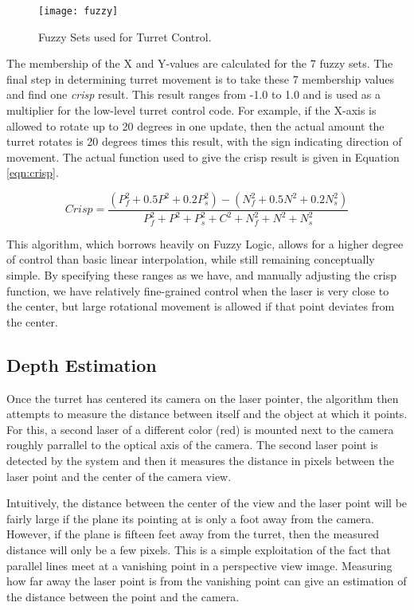 \documentclass[10pt,twocolumn,letterpaper]{article}
\begin{document}
\begin{figure}[t]
\begin{center}
  \texttt{[image: fuzzy]}
\end{center}
   \caption{Fuzzy Sets used for Turret Control.}
\label{fig:fuzzy}
\end{figure}

The membership of the X and Y-values are calculated for the 7 fuzzy sets. The final step in determining turret movement is to take these 7 membership values and find one \textit{crisp} result. This result ranges from -1.0 to 1.0 and is used as a multiplier for the low-level turret control code. For example, if the X-axis is allowed to rotate up to 20 degrees in one update, then the actual amount the turret rotates is 20 degrees times this result, with the sign indicating direction of movement. The actual function used to give the crisp result is given in Equation \ref{eqn:crisp}.

\begin{equation}
	\mathit{Crisp} = \frac{(P_f^2 + 0.5P^2 + 0.2P_s^2) - (N_f^2 + 0.5N^2 + 0.2N_s^2)}{P_f^2+P^2+P_s^2+C^2+N_f^2+N^2+N_s^2}
\label{eqn:crisp}
\end{equation}

This algorithm, which borrows heavily on Fuzzy Logic, allows for a higher degree of control than basic linear interpolation, while still remaining conceptually simple. By specifying these ranges as we have, and manually adjusting the crisp function, we have relatively fine-grained control when the laser is very close to the center, but large rotational movement is allowed if that point deviates from the center.

\subsection{Depth Estimation}

Once the turret has centered its camera on the laser pointer, the algorithm then attempts to measure the distance between itself and the object at which it points.  For this, a second laser of a different color (red) is mounted next to the camera roughly parrallel to the optical axis of the camera.  The second laser point is detected by the system and then it measures the distance in pixels between the laser point and the center of the camera view. 

Intuitively, the distance between the center of the view and the laser point will be fairly large if the plane its pointing at is only a foot away from the camera.  However, if the plane is fifteen feet away from the turret, then the measured distance will only be a few pixels.  This is a simple exploitation of the fact that parallel lines meet at a vanishing point in a perspective view image. Measuring how far away the laser point is from the vanishing point can give an estimation of the distance between the point and the camera.
\end{document}

